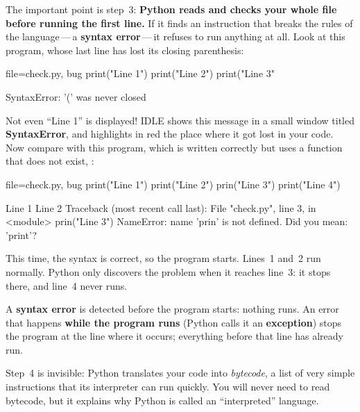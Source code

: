 The important point is step~3: \textbf{Python reads and checks your whole file before running the
first line.} If it finds an instruction that breaks the rules of the language\,---\,a
\textbf{syntax error}\,---\,it refuses to run anything at all. Look at this program, whose last line
has lost its closing parenthesis:

\begin{code}{file=check.py, bug}
print("Line 1")
print("Line 2")
print("Line 3"
\end{code}
\begin{erreur}
SyntaxError: '(' was never closed
\end{erreur}

Not even \enquote{Line 1} is displayed! IDLE shows this message in a small window titled
\textbf{SyntaxError}, and highlights in red the place where it got lost in your code. Now compare
with this program, which is written correctly but uses a function that does not exist, :

\begin{code}{file=check.py, bug}
print("Line 1")
print("Line 2")
prin("Line 3")
print("Line 4")
\end{code}
\begin{erreur}
Line 1
Line 2
Traceback (most recent call last):
  File "check.py", line 3, in <module>
    prin("Line 3")
NameError: name 'prin' is not defined. Did you mean: 'print'?
\end{erreur}

This time, the syntax is correct, so the program starts. Lines~1 and~2 run normally. Python only
discovers the problem when it reaches line~3: it stops there, and line~4 never runs.

\begin{regle}
A \textbf{syntax error} is detected before the program starts: nothing runs. An error that happens
\textbf{while the program runs} (Python calls it an \textbf{exception}) stops the program at the
line where it occurs; everything before that line has already run.
\end{regle}

\begin{culture}[Bytecode]
Step~4 is invisible: Python translates your code into \emph{bytecode}, a list of very simple
instructions that its interpreter can run quickly. You will never need to read bytecode, but it
explains why Python is called an \enquote{interpreted} language.
\end{culture}


